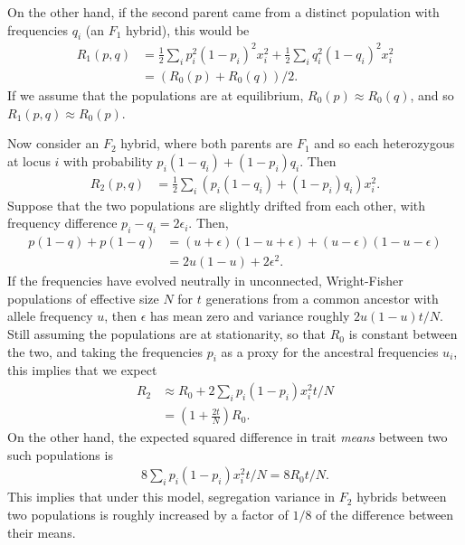 \documentclass{article}
\newcommand{\1}{\mathbbm{1}}
\begin{document}
On the other hand,
if the second parent came from a distinct population
with frequencies $q_i$
(an $F_1$ hybrid),
this would be
\begin{align*}
    R_1(p,q) &= \frac{1}{2} \sum_i p_i^2 (1-p_i)^2 x_i^2 
                + \frac{1}{2} \sum_i q_i^2 (1-q_i)^2 x_i^2 \\
                &= (R_0(p) + R_0(q))/2 .
\end{align*}
If we assume that the populations are at equilibrium, $R_0(p) \approx R_0(q)$,
and so $R_1(p,q) \approx R_0(p)$.

Now consider an $F_2$ hybrid, where both parents are $F_1$
and so each heterozygous at locus $i$ with probability $p_i (1-q_i) + (1-p_i) q_i$.
Then
\begin{align*}
    R_2(p,q) &= \frac{1}{2} \sum_i \left(p_i (1-q_i) + (1-p_i) q_i \right) x_i^2  .
\end{align*}
Suppose that the two populations are slightly drifted from each other,
with frequency difference $p_i-q_i = 2\epsilon_i$.
Then,
\begin{align*}
    p (1-q) + p (1-q)
    &=
    (u+\epsilon) (1-u+\epsilon) + (u-\epsilon) (1-u-\epsilon) \\
    &=
    2 u (1-u)
    + 2 \epsilon^2 .
\end{align*}
If the frequencies have evolved neutrally in unconnected, Wright-Fisher populations 
of effective size $N$ for $t$ generations from a common ancestor with allele frequency $u$,
then $\epsilon$ has mean zero and variance roughly $2 u (1-u) t/N$.
Still assuming the populations are at stationarity,
so that $R_0$ is constant between the two,
and taking the frequencies $p_i$ as a proxy for the ancestral frequencies $u_i$,
this implies that we expect
\begin{align*}
    R_2 
    &\approx 
    R_0 + 2 \sum_i p_i (1-p_i) x_i^2 t/N \\
    &=
    \left( 1 + \frac{2t}{N} \right) R_0 .
\end{align*}
On the other hand, the expected squared difference in trait \emph{means} between two such populations is
\begin{align} \label{eqn:var_dx}
    8 \sum_i p_i (1-p_i) x_i^2 t / N = 8 R_0 t /N .
\end{align}
This implies that under this model,
segregation variance in $F_2$ hybrids between two populations
is roughly increased by a factor of $1/8$ of the difference between their means.
\end{document}
